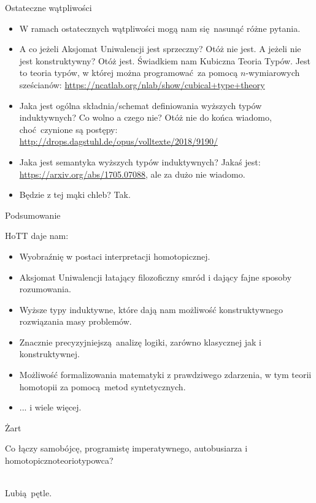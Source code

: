 \documentclass{beamer}
\begin{document}
\begin{frame}{Ostateczne wątpliwości}
\begin{itemize}
	\item W ramach ostatecznych wątpliwości mogą nam się nasunąć różne pytania.
	\item A co jeżeli Aksjomat Uniwalencji jest sprzeczny? Otóż nie jest. A jeżeli nie jest konstruktywny? Otóż jest. Świadkiem nam Kubiczna Teoria Typów. Jest to teoria typów, w której można programować za pomocą $n$-wymiarowych sześcianów: \url{https://ncatlab.org/nlab/show/cubical+type+theory}
	\item Jaka jest ogólna składnia/schemat definiowania wyższych typów induktywnych? Co wolno a czego nie? Otóż nie do końca wiadomo, choć czynione są postępy: \url{http://drops.dagstuhl.de/opus/volltexte/2018/9190/}
	\item Jaka jest semantyka wyższych typów induktywnych? Jakaś jest: \url{https://arxiv.org/abs/1705.07088}, ale za dużo nie wiadomo.
	\item Będzie z tej mąki chleb? Tak.
\end{itemize}
\end{frame}

\begin{frame}{Podsumowanie}

HoTT daje nam:
\begin{itemize}
	\item Wyobraźnię w postaci interpretacji homotopicznej.
	\item Aksjomat Uniwalencji łatający filozoficzny smród i dający fajne sposoby rozumowania.
	\item Wyższe typy induktywne, które dają nam możliwość konstruktywnego rozwiązania masy problemów.
	\item Znacznie precyzyjniejszą analizę logiki, zarówno klasycznej jak i konstruktywnej.
	\item Możliwość formalizowania matematyki z prawdziwego zdarzenia, w tym teorii homotopii za pomocą metod syntetycznych.
	\item ... i wiele więcej.
\end{itemize}

\end{frame}

\begin{frame}{Żart}

Co łączy samobójcę, programistę imperatywnego, autobusiarza i homotopicznoteoriotypowca? \\~\

Lubią pętle.

\end{frame}
\end{document}
